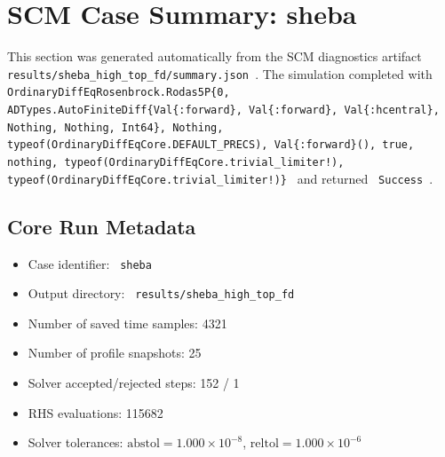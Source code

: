 \section{SCM Case Summary: sheba}
\label{sec:scm_case_sheba_high_top_fd_sheba_250x2m_12h_report}

This section was generated automatically from the SCM diagnostics artifact
\texttt{ results/sheba\_high\_top\_fd/summary.json }. The simulation completed with \texttt{ OrdinaryDiffEqRosenbrock.Rodas5P\{0, ADTypes.AutoFiniteDiff\{Val\{:forward\}, Val\{:forward\}, Val\{:hcentral\}, Nothing, Nothing, Int64\}, Nothing, typeof(OrdinaryDiffEqCore.DEFAULT\_PRECS), Val\{:forward\}(), true, nothing, typeof(OrdinaryDiffEqCore.trivial\_limiter!), typeof(OrdinaryDiffEqCore.trivial\_limiter!)\} }
and returned \texttt{ Success }.

\subsection{Core Run Metadata}
\begin{itemize}
  \item Case identifier: \texttt{ sheba }
  \item Output directory: \texttt{ results/sheba\_high\_top\_fd }
  \item Number of saved time samples: 4321
  \item Number of profile snapshots: 25
  \item Solver accepted/rejected steps: 152 / 1
  \item RHS evaluations: 115682
  \item Solver tolerances: $\mathrm{abstol}=1.000 \times 10^{-8}$, $\mathrm{reltol}=1.000 \times 10^{-6}$
\end{itemize}

